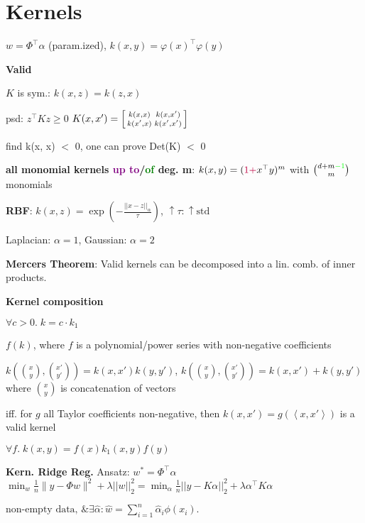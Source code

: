 \section*{Kernels}

$w = \Phi^\top \alpha$ (param.ized), $k(x,y) = \varphi(x)^\top \varphi(y)$


\textbf{Valid} ~ \begin{rowlist}
    \item $K$ is sym.: $k(x,z) = k(z,x)$
    \item psd: $z^\top K z \geq 0$
    $K(x, x') = \begin{bsmallmatrix}
                k(x, x) & k(x, x') \\
                k(x', x) & k(x', x')
                \end{bsmallmatrix}$   
\end{rowlist}

find k(x, x) $<$ 0, one can prove Det(K) $<$ 0

\textbf{all monomial kernels \textcolor{purple}{up to}/\textcolor{green}{of} deg. m}: $k(x,y) = (\textcolor{purple}{1 + }x^\top y)^m$ with $\binom{d+m\textcolor{green}{-1}}{m}$ monomials

\textbf{RBF}: $k(x, z) = \exp ( -\frac{||x - z||_\alpha}{\tau} )$, $\uparrow \tau : \uparrow \text{std}$

Laplacian: $\alpha = 1$, Gaussian: $\alpha = 2$ 


\textbf{Mercers Theorem}: Valid kernels can be decomposed into a lin. comb. of inner products.

\textbf{Kernel composition}

\begin{rowlist}
    \item $\forall c > 0. \; k = c \cdot k_1$
    \item $f(k)$, where $f$ is a polynomial/power series with non-negative coefficients
    \item{
        $k(\binom{x}{y}, \binom{x'}{y'})=k(x,x')k(y,y')$, $k(\binom{x}{y}, \binom{x'}{y'})=k(x,x') + k(y,y')$ where $\binom{x}{y}$ is concatenation of vectors
    }
    \item iff. for $g$ all Taylor coefficients non-negative, then $k(x, x') = g(\left< x, x' \right>)$ is a valid kernel
    \item $\forall f. \; k(x,y) = f(x)k_1(x,y)f(y)$
\end{rowlist}

\textbf{Kern. Ridge Reg.}
Ansatz: $w^*=\Phi^\top\alpha$\\
$\min_w \frac1n \|y - \Phi w\|^2 + \lambda ||w||_2^2 = \min_\alpha \frac1n ||y - K\alpha||_2^2 + \lambda \alpha^\top K \alpha$

$\text{non-empty data, } \& \exists \hat{\alpha} : \hat{w} = \sum_{i=1}^{n} \hat{\alpha}_i \phi(x_i).$
